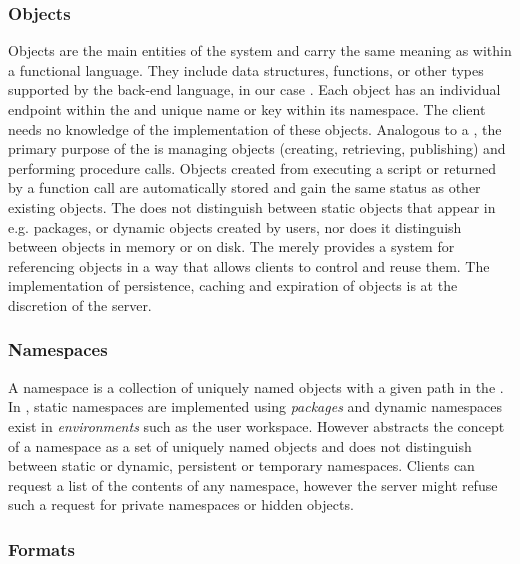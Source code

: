 \subsubsection{Objects}

Objects are the main entities of the system and carry the same meaning as within a functional language. They include data structures, functions, or other types supported by the back-end language, in our case \R. Each object has an individual endpoint within the \API and unique name or key within its namespace. The client needs no knowledge of the implementation of these objects. Analogous to a \UI, the primary purpose of the \API is managing objects (creating, retrieving, publishing) and performing procedure calls. Objects created from executing a script or returned by a function call are automatically stored and gain the same status as other existing objects. The \API does not distinguish between static objects that appear in e.g. packages, or dynamic objects created by users, nor does it distinguish between objects in memory or on disk. The \API merely provides a system for referencing objects in a way that allows clients to control and reuse them. The implementation of persistence, caching and expiration of objects is at the discretion of the server. 

\subsubsection{Namespaces}

A namespace is a collection of uniquely named objects with a given path in the \API. In \R, static namespaces are implemented using \emph{packages} and dynamic namespaces exist in \emph{environments} such as the user workspace. However \OpenCPU abstracts the concept of a namespace as a set of uniquely named objects and does not distinguish between static or dynamic, persistent or temporary namespaces. Clients can request a list of the contents of any namespace, however the server might refuse such a request for private namespaces or hidden objects. 

\subsubsection{Formats}

